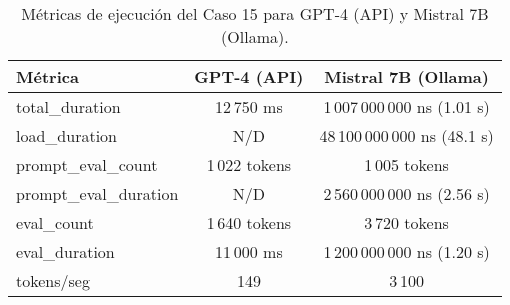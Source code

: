 
\begin{table}[h!]
\centering
\begin{tabular}{|l|c|c|}
\hline
\textbf{Métrica} & \textbf{GPT-4 (API)} & \textbf{Mistral 7B (Ollama)} \\
\hline
total\_duration & 12\,750 ms & 1\,007\,000\,000 ns (1.01 s) \\
load\_duration & N/D & 48\,100\,000\,000 ns (48.1 s) \\
prompt\_eval\_count & 1\,022 tokens & 1\,005 tokens \\
prompt\_eval\_duration & N/D & 2\,560\,000\,000 ns (2.56 s) \\
eval\_count & 1\,640 tokens & 3\,720 tokens \\
eval\_duration & 11\,000 ms & 1\,200\,000\,000 ns (1.20 s) \\
tokens/seg & 149 & 3\,100 \\
\hline
\end{tabular}
\caption{Métricas de ejecución del Caso 15 para GPT-4 (API) y Mistral 7B (Ollama).}
\end{table}
